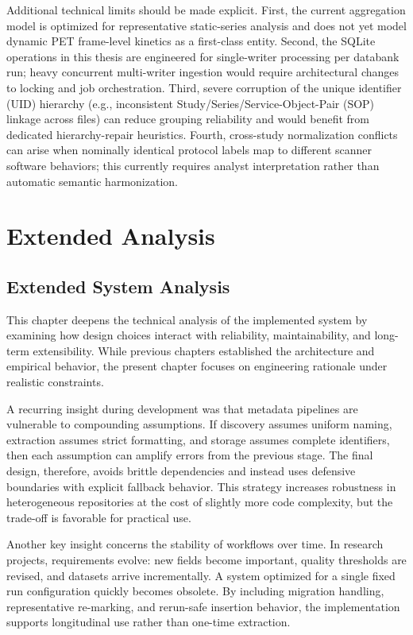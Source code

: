 Additional technical limits should be made explicit. First, the current aggregation model is optimized for representative static-series analysis and does not yet model dynamic PET frame-level kinetics as a first-class entity. Second, the SQLite operations in this thesis are engineered for single-writer processing per databank run; heavy concurrent multi-writer ingestion would require architectural changes to locking and job orchestration. Third, severe corruption of the unique identifier (UID) hierarchy (e.g., inconsistent Study/Series/Service-Object-Pair (SOP) linkage across files) can reduce grouping reliability and would benefit from dedicated hierarchy-repair heuristics. Fourth, cross-study normalization conflicts can arise when nominally identical protocol labels map to different scanner software behaviors; this currently requires analyst interpretation rather than automatic semantic harmonization.

\section{Extended Analysis}
\subsection{Extended System Analysis}
This chapter deepens the technical analysis of the implemented system by examining how design choices interact with reliability, maintainability, and long-term extensibility. While previous chapters established the architecture and empirical behavior, the present chapter focuses on engineering rationale under realistic constraints.

A recurring insight during development was that metadata pipelines are vulnerable to compounding assumptions. If discovery assumes uniform naming, extraction assumes strict formatting, and storage assumes complete identifiers, then each assumption can amplify errors from the previous stage. The final design, therefore, avoids brittle dependencies and instead uses defensive boundaries with explicit fallback behavior. This strategy increases robustness in heterogeneous repositories at the cost of slightly more code complexity, but the trade-off is favorable for practical use.

Another key insight concerns the stability of workflows over time. In research projects, requirements evolve: new fields become important, quality thresholds are revised, and datasets arrive incrementally. A system optimized for a single fixed run configuration quickly becomes obsolete. By including migration handling, representative re-marking, and rerun-safe insertion behavior, the implementation supports longitudinal use rather than one-time extraction.

